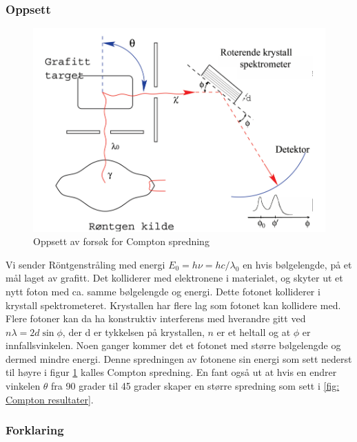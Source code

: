 \subsubsection{Oppsett}
\begin{figure}[h!]
  \centering
  \includegraphics[scale = .4]{Figures/Compton oppsett.png}
  \caption{Oppsett av forsøk for Compton spredning}
  \label{fig: Compton oppsett}
\end{figure}

Vi sender Röntgenstråling med energi $E_0 = hν = h c / λ_0$ en hvis bølgelengde, på et mål laget av grafitt. Det kolliderer med elektronene i materialet, og skyter ut et nytt foton med ca. samme bølgelengde og energi. Dette fotonet kolliderer i krystall spektrometeret. Krystallen har flere lag som fotonet kan kollidere med. Flere fotoner kan da ha konstruktiv interferens med hverandre gitt ved $nλ = 2d \sin ϕ$, der d er tykkelsen på krystallen, $n$ er et heltall og at $ϕ$ er innfallsvinkelen. Noen ganger kommer det et fotonet med større bølgelengde og dermed mindre energi. Denne spredningen av fotonene sin energi som sett nederst til høyre i figur \ref{fig: Compton oppsett} kalles Compton spredning. En fant også ut at hvis en endrer vinkelen $θ$ fra 90 grader til 45 grader skaper en større spredning som sett i \ref{fig: Compton resultater}. 

\subsubsection{Forklaring}

